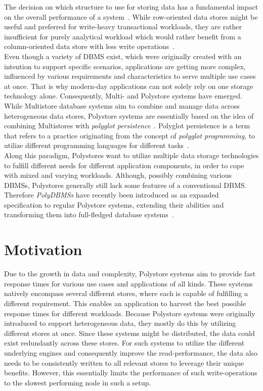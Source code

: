 The decision on which structure to use for storing data has a fundamental impact on the overall performance of a system~\cite{plattner2015}.
While row-oriented data stores might be useful and preferred for write-heavy transactional 
workloads, they are rather insufficient for purely analytical workload which would rather benefit from a
column-oriented data store with less write operations~\cite{sigmond2008}.\\
Even though a variety of DBMS exist, which were originally created with an intention to support specific scenarios,
applications are getting more complex, influenced by various requirements and characteristics to serve multiple use cases at once.
That is why modern-day applications can not solely rely on one storage technology alone. 
Consequently, Multi- and Polystore systems have emerged.
While Multistore database systems aim to combine and manage data across heterogeneous data stores,
Polystore systems are essentially based on the idea of combining Multistores with
\textit{polyglot persistence}~\cite{polypheny2020}.
Polyglot persistence is a term that refers to a practice originating from the concept 
of \textit{polyglot programming}, to utilize different 
programming languages for different tasks~\cite{fowler2011}. \\
Along this paradigm, Polystores want to utilize multiple data storage technologies to
fulfill different needs for different application components, in order to cope
with mixed and varying workloads.
Although, possibly combining various DBMSs, Polystores generally still lack some features of a conventional DBMS.
Therefore \emph{PolyDBMSs} have recently been introduced as an expanded specification to 
regular Polystore systems, extending their abilities and transforming them into full-fledged database systems~\cite{polypheny2021}.


\section{Motivation}

Due to the growth in data and complexity, Polystore systems aim to provide fast response times for various use cases and applications of all kinds.
These systems natively encompass several different stores, where each is capable of fulfilling a different requirement. 
This enables an application to harvest the best possible response times for different workloads.
Because Polystore systems were originally introduced to support heterogeneous data, they mostly do this by utilizing different stores at once.
Since these systems might be distributed, the data could exist redundantly across these stores. 
For such systems to utilize the different underlying engines and consequently improve the read-performance, 
the data also needs to be consistently written to all relevant stores to leverage their unique benefits.
However, this essentially limits the performance of such write-operations to the slowest performing node in such a setup.

